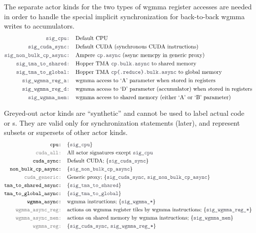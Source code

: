 \filbreak
{} The separate actor kinds for the two types of wgmma register accesses are needed in order to handle the special implicit synchronization for back-to-back wgmma writes to accumulators.
\begin{align*}
\lighttt{sig\_cpu: } & \text{Default CPU}\\
\lighttt{sig\_cuda\_sync: } & \text{Default CUDA (synchronous CUDA instructions)}\\
\lighttt{sig\_non\_bulk\_cp\_async: } & \text{Ampere \lighttt{cp.async} (async memcpy in generic proxy)}\\
\lighttt{sig\_tma\_to\_shared: } & \text{Hopper TMA \lighttt{cp.bulk.async} to shared memory}\\
\lighttt{sig\_tma\_to\_global: } & \text{Hopper TMA \lighttt{cp\{.reduce\}.bulk.async} to global memory}\\
\lighttt{sig\_wgmma\_reg\_a: } & \text{wgmma access to `A' parameter when stored in registers}\\
\lighttt{sig\_wgmma\_reg\_d: } & \text{wgmma access to `D' parameter (accumulator) when stored in registers}\\
\lighttt{sig\_wgmma\_mem: } & \text{wgmma access to shared memory (either `A' or `B' parameter)}
\end{align*}

\filbreak
{} Greyed-out actor kinds are ``synthetic'' and cannot be used to label actual code or s.
They are valid only for synchronization statements (later), and represent subsets or supersets of other actor kinds.
\begin{align*}
\texttt{cpu: } & \{\lighttt{sig\_cpu}\}\\
\graytt{cuda\_all: } & \text{All actor signatures except \lighttt{sig\_cpu}}\\
\texttt{cuda\_sync: } & \text{Default CUDA; \{\lighttt{sig\_cuda\_sync}\}}\\
\texttt{non\_bulk\_cp\_async: } & \{\lighttt{sig\_non\_bulk\_cp\_async}\}\\
\graytt{cuda\_generic: } & \text{Generic proxy; \{\lighttt{sig\_cuda\_sync}, \lighttt{sig\_non\_bulk\_cp\_async}\}}\\
\texttt{tma\_to\_shared\_async: } & \text{\{\lighttt{sig\_tma\_to\_shared}\}}\\
\texttt{tma\_to\_global\_async: } & \text{\{\lighttt{sig\_tma\_to\_global}\}}\\
\texttt{wgmma\_async: } & \text{wgmma instructions; \{\lighttt{sig\_wgmma\_*}\}}\\
\graytt{wgmma\_async\_reg: } & \text{actions on wgmma register tiles by wgmma instructions; \{\lighttt{sig\_wgmma\_reg\_*}\}}\\
\graytt{wgmma\_async\_mem: } & \text{actions on shared memory by wgmma instructions; \{\lighttt{sig\_wgmma\_mem}\}}\\
\graytt{wgmma\_reg: } & \text{\{\lighttt{sig\_cuda\_sync}, \lighttt{sig\_wgmma\_reg\_*}\}}
\end{align*}

